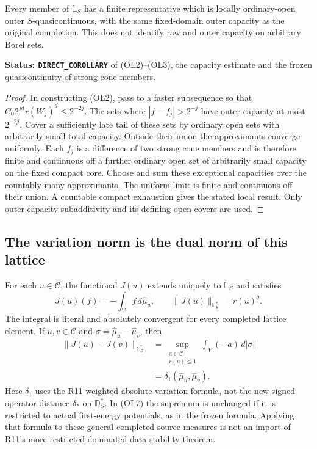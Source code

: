 \begin{proposition}
\label{prop:r12-lattice-quasicontinuity}
Every member of $\mathbb L_S$ has a finite representative
which is locally ordinary-open outer $S$-quasicontinuous,
with the same fixed-domain outer capacity as the original
completion.  This does not identify raw and outer capacity
on arbitrary Borel sets.
\end{proposition}

\noindent\textbf{Status: \texttt{DIRECT\_COROLLARY}} of
\textup{(OL2)--(OL3)}, the capacity estimate and the frozen
quasicontinuity of strong cone members.

\begin{proof}
In constructing \textup{(OL2)}, pass to a faster subsequence
so that
$C_0 2^{jd}r(W_j)^d\le2^{-2j}$.
The sets where $|f-f_j|>2^{-j}$ have outer capacity at
most $2^{-2j}$.  Cover a sufficiently late tail of these
sets by ordinary open sets with arbitrarily small total
capacity.  Outside their union the approximants converge
uniformly.  Each $f_j$ is a difference of two strong cone
members and is therefore finite and continuous off a
further ordinary open set of arbitrarily small capacity
on the fixed compact core.  Choose and sum these exceptional
capacities over the countably many approximants.  The uniform
limit is finite and continuous off their union.  A countable
compact exhaustion gives the stated local result.  Only
outer capacity subadditivity and its defining open covers
are used.
\end{proof}

\subsection{The variation norm is the dual norm of this lattice}

\begin{theorem}
\label{thm:r12-lattice-dual-variation}
For each $u\in\mathscr C$, the functional $J(u)$ extends
uniquely to $\mathbb L_S$ and satisfies
\[
 J(u)(f)=-\int_V f\,d\widehat\mu_u,\qquad
 \|J(u)\|_{\mathbb L_S^*}=r(u)^q.
 \tag{OL6}
\]
The integral is literal and absolutely convergent for every
completed lattice element.  If $u,v\in\mathscr C$ and
$\sigma=\widehat\mu_u-\widehat\mu_v$, then
\[
 \begin{split}
 \|J(u)-J(v)\|_{\mathbb L_S^*}
   &=\sup_{\substack{a\in\mathscr C\\r(a)\le1}}
                               \int_V(-a)\,d|\sigma|\\
   &=\delta_1(\widehat\mu_u,\widehat\mu_v).
 \end{split}
 \tag{OL7}
\]
Here $\delta_1$ uses the R11 weighted absolute-variation
formula, not the new signed operator distance $\delta_*$
on $\mathbb D_S^*$.  In \textup{(OL7)} the supremum is
unchanged if it is restricted to actual first-energy
potentials, as in the frozen formula.  Applying that
formula to these general completed source measures is
not an import of R11's more restricted dominated-data
stability theorem.
\end{theorem}

